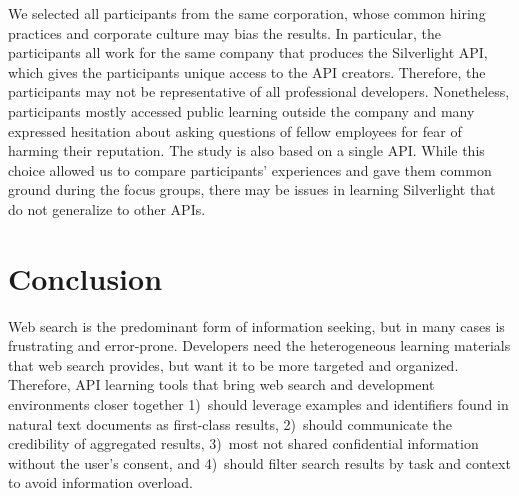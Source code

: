We selected all participants from the same corporation, whose common hiring practices and corporate culture may bias the results. In particular, the participants all work for the same company that produces the Silverlight API, which gives the participants unique access to the API creators. 
Therefore, the participants may not be representative of all professional developers. 
Nonetheless, participants mostly accessed public learning outside the company and many expressed hesitation about asking questions of fellow employees for fear of harming their reputation. 
The study is also based on a single API. While this choice allowed us to compare participants' experiences and gave them common ground during the focus groups, there may be issues in learning Silverlight that do not generalize to other APIs. 

\moarsauce
\section{Conclusion}



Web search is the predominant form of information seeking, but in many cases is frustrating and error-prone. Developers need the heterogeneous learning materials that web search provides, but want it to be more targeted and organized. 
Therefore, API learning tools that bring web search and development environments closer together 
	1)~should leverage examples and identifiers found in natural text documents as first-class results,
	2)~should communicate the credibility of aggregated results,
	3)~most not shared confidential information without the user's consent,
	and 4)~should filter search results by task and context to avoid information overload. 

